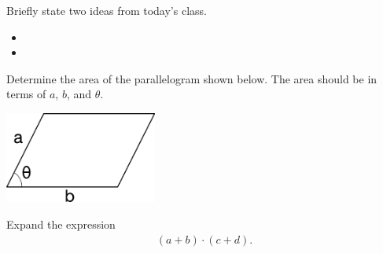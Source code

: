 \begin{problem}
\item Briefly state two ideas from today's class.
  \begin{itemize}
  \item 
  \item 
  \end{itemize}
\item 
  \begin{subproblem}
    \item
  \end{subproblem}
\end{problem}



\begin{problem}
\item Determine the area of the parallelogram shown below. The area
  should be in terms of $a$, $b$, and $\theta$.

  \includegraphics[width=5cm]{ink/week11/parallelogram}

  \vfill

\item Expand the expression 
  \begin{eqnarray*}
    \left( a + b \right) \cdot \left( c + d \right).
  \end{eqnarray*}

  \vfill

\end{problem}


